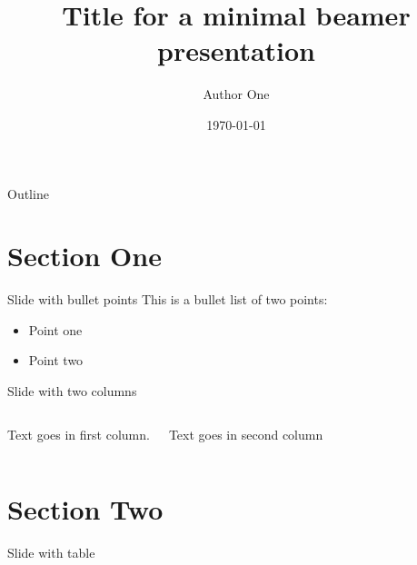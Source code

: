 \documentclass{beamer}					%
\title{Title for a minimal beamer presentation}	%
\author{Author One}								%
\institute{Name of institution}					%
\date{\today}									%
\begin{document}
\begin{frame}
  \titlepage
\end{frame}

\begin{frame}{Outline}
  \tableofcontents
\end{frame}

%

\section{Section One}

\begin{frame}{Slide with bullet points}
	This is a bullet list of two points:
    \begin{itemize}
		\item Point one
        \item Point two
	\end{itemize}
\end{frame}

\begin{frame}{Slide with two columns}
	\begin{columns}
        Text goes in first column.
        
        Text goes in second column
	\end{columns}
\end{frame}

\section{Section Two}

\begin{frame}{Slide with table}
	
\end{frame}
\end{document}
